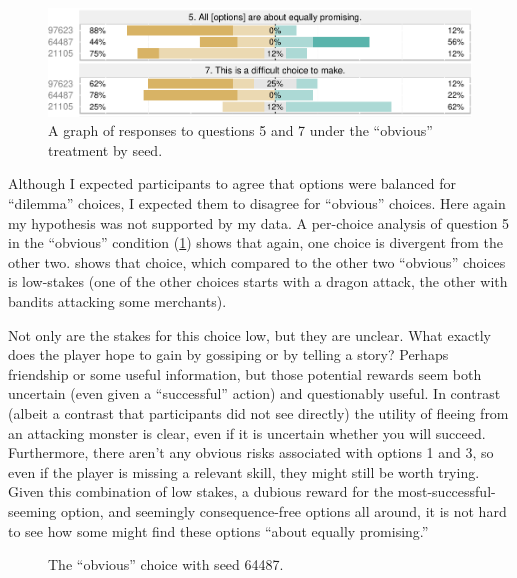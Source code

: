 \begin{figure}[!h]
  \includegraphics[width=\textwidth]{fig/obvious-q5-q7.pdf}
  \caption{A graph of responses to questions 5 and 7 under the ``obvious'' treatment by seed.}
  \label{fig:obviousq57}
\end{figure}


Although I expected participants to agree that options were balanced for ``dilemma'' choices, I expected them to disagree for ``obvious'' choices.
%
Here again my hypothesis was not supported by my data.
%
A per-choice analysis of question 5 in the ``obvious'' condition (\cref{fig:obviousq57}) shows that again, one choice is divergent from the other two.
%
 shows that choice, which compared to the other two ``obvious'' choices is low-stakes (one of the other choices starts with a dragon attack, the other with bandits attacking some merchants).


Not only are the stakes for this choice low, but they are unclear.
%
What exactly does the player hope to gain by gossiping or by telling a story?
%
Perhaps friendship or some useful information, but those potential rewards seem both uncertain (even given a ``successful'' action) and questionably useful.
%
In contrast (albeit a contrast that participants did not see directly) the utility of fleeing from an attacking monster is clear, even if it is uncertain whether you will succeed.
%
Furthermore, there aren't any obvious risks associated with options 1 and 3, so even if the player is missing a relevant skill, they might still be worth trying.
%
Given this combination of low stakes, a dubious reward for the most-successful-seeming option, and seemingly consequence-free options all around, it is not hard to see how some might find these options ``about equally promising.''


\begin{figure}[!h]
\centering
{}
  \caption{The ``obvious'' choice with seed 64487.}
  \label{fig:ch64487}
\end{figure}


